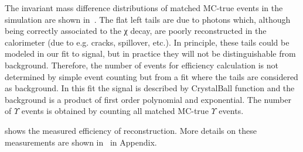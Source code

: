 The invariant mass difference distributions of matched MC-true events in the
\chib simulation are shown in~. The flat left tails
are due to photons which, although being correctly associated to the χ decay,
are poorly reconstructed in the calorimeter (due to e.g. cracks, spillover,
etc.). In principle, these tails could be modeled in our fit to signal, but in
practice they will not be distinguishable from background. Therefore, the
number of \chib events for efficiency calculation is not determined by simple
event counting but from a fit where the tails are considered as background. In
this fit the signal is described by CrystalBall function and the background is
a product of first order polynomial and exponential. The number of $\Upsilon$
events is obtained by counting all matched MC-true $\Upsilon$ events.



 shows the measured efficiency of \chib reconstruction.
More details on these measurements are shown
in~ in Appendix.


